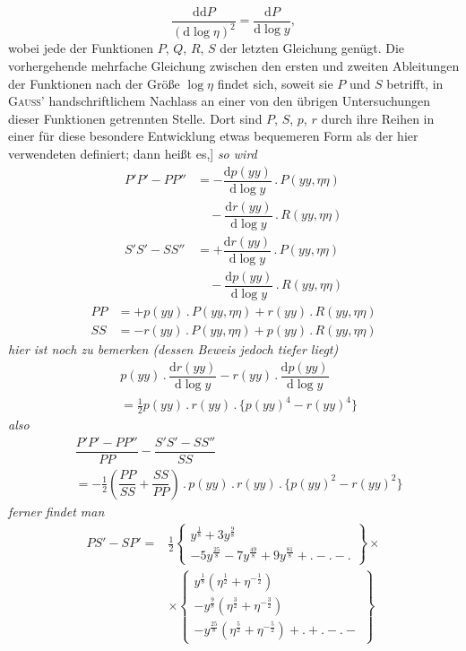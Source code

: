 
\[
\dfrac{\mathrm d\mathrm dP}{(\mathrm d\log\eta)^2}
 =\dfrac{\mathrm dP}{\mathrm d\log y},
\]
wobei jede der Funktionen $P$, $Q$, $R$, $S$ der letzten Gleichung genügt. Die vorhergehende mehrfache Gleichung zwischen den ersten und zweiten Ableitungen der Funktionen nach der Größe $\log\eta$ findet sich, soweit sie $P$ und $S$ betrifft, in \textsc{Gauss}' handschriftlichem Nachlass an einer von den übrigen Untersuchungen dieser Funktionen getrennten Stelle. Dort sind $P$, $S$, $p$, $r$ durch ihre Reihen in einer für diese besondere Entwicklung etwas bequemeren Form als der hier verwendeten definiert; 
dann heißt es,] \textit{so wird}
\[
\begin{aligned}
P'P'-PP''&=-\dfrac{\mathrm dp(yy)}{\mathrm d\log y}\mathbin{.}P(yy,\eta\eta)\\[5pt]&\quad{}-
\dfrac{\mathrm dr(yy)}{\mathrm d\log y}\mathbin{.}R(yy,\eta\eta)\\[9pt]
S'S'-SS''&=+\dfrac{\mathrm dr(yy)}{\mathrm d\log y}\mathbin{.}P(yy,\eta\eta)\\[5pt]&\quad{}-
\dfrac{\mathrm dp(yy)}{\mathrm d\log y}\mathbin{.}R(yy,\eta\eta)
\end{aligned}
\]
\[
\begin{aligned}
PP&=+p(yy)\mathbin{.}P(yy,\eta\eta)+r(yy)\mathbin{.}R(yy,\eta\eta)\\
SS&=-r(yy)\mathbin{.}P(yy,\eta\eta)+p(yy)\mathbin{.}R(yy,\eta\eta)
\end{aligned}
\]
\textit{hier ist noch zu bemerken (dessen Beweis jedoch tiefer liegt)}
\[
\begin{aligned}&p(yy)\mathbin{.}\dfrac{\mathrm dr(yy)}{\mathrm d\log y}
-r(yy)\mathbin{.}\dfrac{\mathrm dp(yy)}{\mathrm d\log y}
\\[6pt]&=\tfrac12p(yy)\mathbin{.}r(yy)\mathbin{.}\{p(yy)^4-r(yy)^4\}\end{aligned}
\]
\textit{also}
\[
\begin{aligned}&\dfrac{P'P'-PP''}{PP}-\dfrac{S'S'-SS''}{SS}
\\[6pt]&=-\tfrac12\left(\dfrac{PP}{SS}+\dfrac{SS}{PP}\right)
\mathbin{.}p(yy)\mathbin{.}r(yy)\mathbin{.}\{p(yy)^2-r(yy)^2\}\end{aligned}
\]
\textit{ferner findet man}
\[
\begin{aligned}
PS'-SP'={}&\tfrac12\left\{\begin{gathered}y^{\frac18}+3y^{\frac98}\\[3pt]-5y^{\frac{25}8}
 -7y^{\frac{49}8}+9y^{\frac{81}8}+\mathord{.}-\mathord{.}-\mathord{.}\end{gathered}\right\}\times\\[10pt]
&\times\left\{\begin{gathered}y^{\frac18}(\eta^{\frac12}+\eta^{-\frac12})
\\[3pt]-y^{\frac98}(\eta^{\frac32}+\eta^{-\frac32})
\\[3pt]-y^{\frac{25}8}(\eta^{\frac52}+\eta^{-\frac52})
 +\mathord{.}+\mathord{.}-\mathord{.}-\end{gathered}\right\}
\end{aligned}
\]
